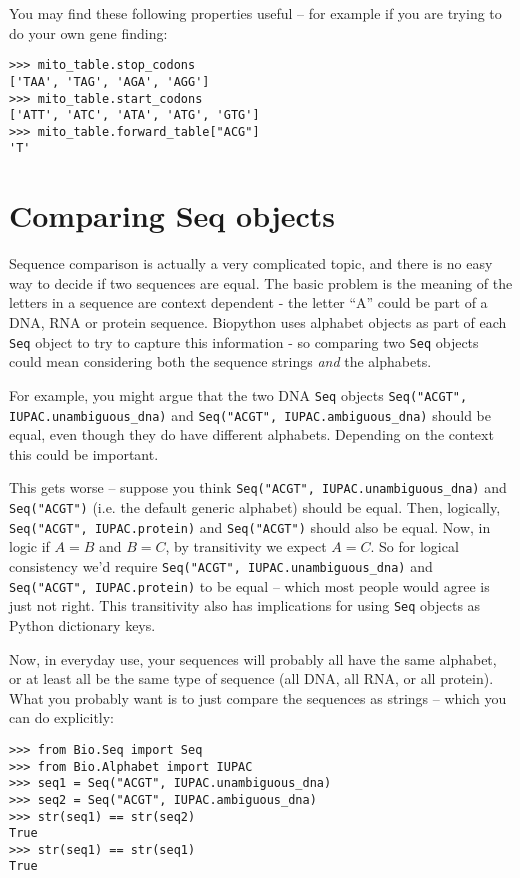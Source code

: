 You may find these following properties useful -- for example if you are trying
to do your own gene finding:

\begin{verbatim}
>>> mito_table.stop_codons
['TAA', 'TAG', 'AGA', 'AGG']
>>> mito_table.start_codons
['ATT', 'ATC', 'ATA', 'ATG', 'GTG']
>>> mito_table.forward_table["ACG"]
'T'
\end{verbatim}

\section{Comparing Seq objects}
\label{sec:seq-comparison}

Sequence comparison is actually a very complicated topic, and there is no easy
way to decide if two sequences are equal. The basic problem is the meaning of
the letters in a sequence are context dependent - the letter ``A'' could be part
of a DNA, RNA or protein sequence. Biopython uses alphabet objects as part of
each \verb|Seq| object to try to capture this information - so comparing two
\verb|Seq| objects could mean considering both the sequence strings \emph{and}
the alphabets.

For example, you might argue that the two DNA \verb|Seq| objects
\texttt{Seq("ACGT", IUPAC.unambiguous\_dna)} and
\texttt{Seq("ACGT", IUPAC.ambiguous\_dna)} should be equal, even though
they do have different alphabets. Depending on the context this could be
important.

This gets worse -- suppose you think \texttt{Seq("ACGT",
IUPAC.unambiguous\_dna)} and \texttt{Seq("ACGT")} (i.e. the default generic
alphabet) should be equal. Then, logically, \texttt{Seq("ACGT", IUPAC.protein)}
and \texttt{Seq("ACGT")} should also be equal. Now, in logic if $A=B$ and
$B=C$, by transitivity we expect $A=C$. So for logical consistency we'd
require \texttt{Seq("ACGT", IUPAC.unambiguous\_dna)} and \texttt{Seq("ACGT",
IUPAC.protein)} to be equal -- which most people would agree is just not right.
This transitivity also has implications for using \verb|Seq| objects as
Python dictionary keys.

Now, in everyday use, your sequences will probably all have the same
alphabet, or at least all be the same type of sequence (all DNA, all RNA, or
all protein). What you probably want is to just compare the sequences as
strings -- which you can do explicitly:

\begin{verbatim}
>>> from Bio.Seq import Seq
>>> from Bio.Alphabet import IUPAC
>>> seq1 = Seq("ACGT", IUPAC.unambiguous_dna)
>>> seq2 = Seq("ACGT", IUPAC.ambiguous_dna)
>>> str(seq1) == str(seq2)
True
>>> str(seq1) == str(seq1)
True
\end{verbatim}

